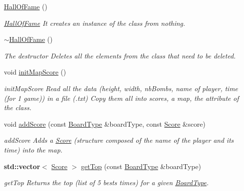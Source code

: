 \begin{DoxyCompactItemize}
\item 
\mbox{\label{class_hall_of_fame_a158b9ebd9094021024497bd5f3e04199}} 
\hyperlink{class_hall_of_fame_a158b9ebd9094021024497bd5f3e04199}{Hall\+Of\+Fame} ()
\begin{DoxyCompactList}\small\item\em \hyperlink{class_hall_of_fame}{Hall\+Of\+Fame} It creates an instance of the class from nothing. \end{DoxyCompactList}\item 
\mbox{\label{class_hall_of_fame_a5960b73dc9e85927117541675c855ca7}} 
\hyperlink{class_hall_of_fame_a5960b73dc9e85927117541675c855ca7}{$\sim$\+Hall\+Of\+Fame} ()
\begin{DoxyCompactList}\small\item\em The destructor Deletes all the elements from the class that need to be deleted. \end{DoxyCompactList}\item 
\mbox{\label{class_hall_of_fame_a9ce6a64635d9087f0bce2f6b911918ab}} 
void \hyperlink{class_hall_of_fame_a9ce6a64635d9087f0bce2f6b911918ab}{init\+Map\+Score} ()
\begin{DoxyCompactList}\small\item\em init\+Map\+Score Read all the data (height, width, nb\+Bombs, name of player, time (for 1 game)) in a file (.txt) Copy them all into scores, a map, the attribute of the class. \end{DoxyCompactList}\item 
void \hyperlink{class_hall_of_fame_af27ed4518905f0a948112a05268ffd73}{add\+Score} (const \hyperlink{struct_board_type}{Board\+Type} \&board\+Type, const \hyperlink{class_score}{Score} \&score)
\begin{DoxyCompactList}\small\item\em add\+Score Adds a \hyperlink{class_score}{Score} (structure composed of the name of the player and its time) into the map. \end{DoxyCompactList}\item 
\textbf{ std\+::vector}$<$ \hyperlink{class_score}{Score} $>$ \hyperlink{class_hall_of_fame_aa5df9550ea310ad6d72c55c0656213a0}{get\+Top} (const \hyperlink{struct_board_type}{Board\+Type} \&board\+Type)
\begin{DoxyCompactList}\small\item\em get\+Top Returns the top (list of 5 bests times) for a given \hyperlink{struct_board_type}{Board\+Type}. \end{DoxyCompactList}\item 

\end{DoxyCompactItemize}
